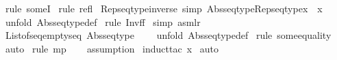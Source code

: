 \begin{isabellebody}
\ {\isacharparenleft}rule\ someI{\isacharparenright}\isanewline
{}\isamarkupfalse%
\ {\isacharparenleft}rule\ refl{\isacharparenright}\isanewline
{}\isamarkupfalse%
%
\endisatagproof
{\isafoldproof}%
%
\isadelimproof
\isanewline
%
\endisadelimproof
\isanewline
{}\isamarkupfalse%
\ Rep{\isacharunderscore}seqtype{\isacharunderscore}inverse\ {\isacharbrackleft}simp{\isacharbrackright}{\isacharcolon}\ {\isachardoublequoteopen}Abs{\isacharunderscore}seqtype{\isacharparenleft}Rep{\isacharunderscore}seqtype{\isacharparenleft}x{\isacharparenright}{\isacharparenright}\ {\isacharequal}\ x{\isachardoublequoteclose}\isanewline
%
\isadelimproof
%
\endisadelimproof
%
\isatagproof
{}\isamarkupfalse%
\ {\isacharparenleft}unfold\ Abs{\isacharunderscore}seqtype{\isacharunderscore}def{\isacharparenright}\isanewline
{}\isamarkupfalse%
\ {\isacharparenleft}rule\ Inv{\isacharunderscore}f{\isacharunderscore}f{\isacharparenright}\isanewline
{}\isamarkupfalse%
\ {\isacharparenleft}simp\ {\isacharparenleft}asm{\isacharunderscore}lr{\isacharparenright}{\isacharparenright}\isanewline
{}\isamarkupfalse%
%
\endisatagproof
{\isafoldproof}%
%
\isadelimproof
\isanewline
%
\endisadelimproof
\isanewline
\isanewline
{}\isamarkupfalse%
\ List{\isacharunderscore}of{\isacharunderscore}seq{\isacharunderscore}emptyseq{\isacharcolon}\ {\isachardoublequoteopen}{\isacharparenleft}{\isacharparenleft}Abs{\isacharunderscore}seqtype\ {\isacharpercent}{\isacharless}{\isacharpercent}{\isachargreater}{\isacharparenright}\ {\isacharequal}\ {\isacharbrackleft}{\isacharbrackright}{\isacharparenright}{\isachardoublequoteclose}\isanewline
%
\isadelimproof
%
\endisadelimproof
%
\isatagproof
{}\isamarkupfalse%
\ {\isacharparenleft}unfold\ Abs{\isacharunderscore}seqtype{\isacharunderscore}def{\isacharparenright}\isanewline
{}\isamarkupfalse%
\ {\isacharparenleft}rule\ some{\isacharunderscore}equality{\isacharparenright}\isanewline
{}\isamarkupfalse%
\ auto\isanewline
{}\isamarkupfalse%
\ {\isacharparenleft}rule\ mp{\isacharparenright}\isanewline
{}\isamarkupfalse%
\ {}\ \isanewline
{}\isamarkupfalse%
\ {\isacharparenleft}assumption{\isacharparenright}\isanewline
{}\isamarkupfalse%
\ {\isacharparenleft}induct{\isacharunderscore}tac\ {\isachardoublequoteopen}x{\isachardoublequoteclose}{\isacharparenright}\isanewline
{}\isamarkupfalse%
\ auto\isanewline

\end{isabellebody}
